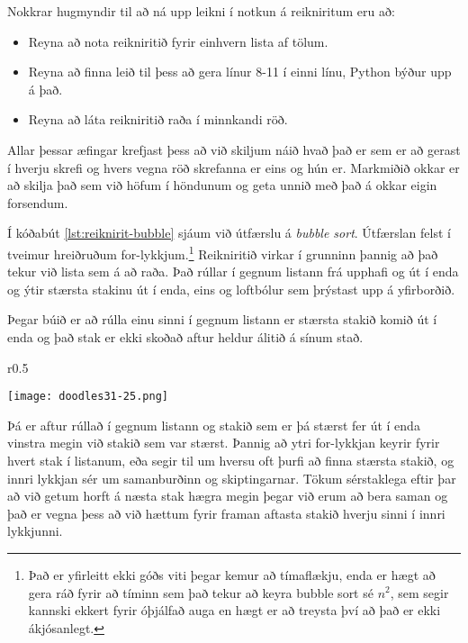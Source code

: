 \vspace{0.3cm}

Nokkrar hugmyndir til að ná upp leikni í notkun á reikniritum eru að:
\begin{itemize}
	\item Reyna að nota reikniritið fyrir einhvern lista af tölum.
	\item Reyna að finna leið til þess að gera línur 8-11 í einni línu, Python býður upp á það.
	\item Reyna að láta reikniritið raða í minnkandi röð.
\end{itemize}

Allar þessar æfingar krefjast þess að við skiljum náið hvað það er sem er að gerast í hverju skrefi og hvers vegna röð skrefanna er eins og hún er.
Markmiðið okkar er að skilja það sem við höfum í höndunum og geta unnið með það á okkar eigin forsendum.

\vspace{0.3cm}

Í kóðabút \ref{lst:reiknirit-bubble} sjáum við útfærslu á \textit{bubble sort}.
Útfærslan felst í tveimur hreiðruðum for-lykkjum.\footnote{Það er yfirleitt ekki góðs viti þegar kemur að tímaflækju, enda er hægt að gera ráð fyrir að tíminn sem það tekur að keyra bubble sort sé $n^2$, sem segir kannski ekkert fyrir óþjálfað auga en hægt er að treysta því að það er ekki ákjósanlegt.}
Reikniritið virkar í grunninn þannig að það tekur við lista sem á að raða.
Það rúllar í gegnum listann frá upphafi og út í enda og ýtir stærsta stakinu út í enda, eins og loftbólur sem þrýstast upp á yfirborðið.


Þegar búið er að rúlla einu sinni í gegnum listann er stærsta stakið komið út í enda og það stak er ekki skoðað aftur heldur álitið á sínum stað.

\begin{wrapfigure}{r}{0.5\textwidth} %
	\begin{center}
		\texttt{[image: doodles31-25.png]}
	\end{center}
\end{wrapfigure}
Þá er aftur rúllað í gegnum listann og stakið sem er þá stærst fer út í enda vinstra megin við stakið sem var stærst.
Þannig að ytri for-lykkjan keyrir fyrir hvert stak í listanum, eða segir til um hversu oft þurfi að finna stærsta stakið, og innri lykkjan sér um samanburðinn og skiptingarnar.
Tökum sérstaklega eftir þar að við getum horft á næsta stak hægra megin þegar við erum að bera saman og það er vegna þess að við hættum fyrir framan aftasta stakið hverju sinni í innri lykkjunni.


